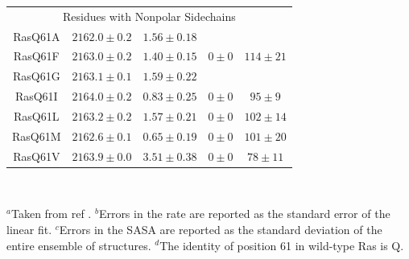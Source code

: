 \begin{table}
\begin{center}
\begin{tabular}{ccccc}
    \multicolumn{5}{c}{Residues with Nonpolar Sidechains} \\
    RasQ61A & $2162.0 \pm 0.2$ & $ 1.56 \pm  0.18 $ &                   &         \\
    RasQ61F & $2163.0 \pm 0.2$ & $ 1.40 \pm  0.15 $ & $0  \pm 0  $ & $114 \pm 21 $\\
    RasQ61G & $2163.1 \pm 0.1$ & $ 1.59 \pm  0.22 $ &              &              \\
    RasQ61I & $2164.0 \pm 0.2$ & $ 0.83 \pm  0.25 $ & $0  \pm 0  $ & $95  \pm 9  $\\      
    RasQ61L & $2163.2 \pm 0.2$ & $ 1.57 \pm  0.21 $ & $0  \pm 0  $ & $102 \pm 14 $\\
    RasQ61M & $2162.6 \pm 0.1$ & $ 0.65 \pm  0.19 $ & $0  \pm 0  $ & $101 \pm 20 $\\
    RasQ61V & $2163.9 \pm 0.0$ & $ 3.51 \pm  0.38 $ & $0  \pm 0  $ & $78  \pm 11 $\\
    \bottomrule
    \end{tabular} \\
    \end{center}
    $^{a}$Taken from ref . $^{b}$Errors in the rate are reported as the standard error of the linear fit. $^{c}$Errors in the SASA are reported as the standard deviation of the entire ensemble of structures. $^{d}$The identity of position 61 in wild-type Ras is Q.
    \label{tbl:ras-data}
\end{table}

